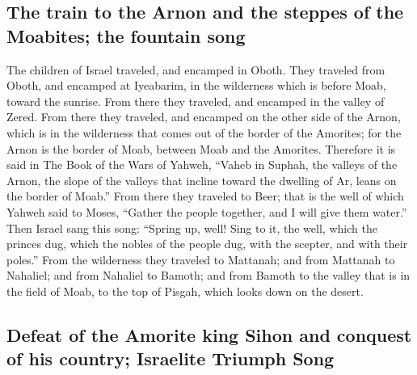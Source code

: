 \hypertarget{the-train-to-the-arnon-and-the-steppes-of-the-moabites-the-fountain-song}{%
\subsection{The train to the Arnon and the steppes of the Moabites; the
fountain
song}\label{the-train-to-the-arnon-and-the-steppes-of-the-moabites-the-fountain-song}}

 The children of Israel traveled, and encamped in Oboth.
 They traveled from Oboth, and encamped at Iyeabarim, in
the wilderness which is before Moab, toward the sunrise. 
From there they traveled, and encamped in the valley of Zered.
 From there they traveled, and encamped on the other side
of the Arnon, which is in the wilderness that comes out of the border of
the Amorites; for the Arnon is the border of Moab, between Moab and the
Amorites.  Therefore it is said in The Book of the Wars
of Yahweh, ``Vaheb in Suphah, the valleys of the Arnon, 
the slope of the valleys that incline toward the dwelling of Ar, leans
on the border of Moab.''  From there they traveled to
Beer; that is the well of which Yahweh said to Moses, ``Gather the
people together, and I will give them water.''  Then
Israel sang this song: ``Spring up, well! Sing to it, 
the well, which the princes dug, which the nobles of the people dug,
with the scepter, and with their poles.'' From the wilderness they
traveled to Mattanah;  and from Mattanah to Nahaliel; and
from Nahaliel to Bamoth;  and from Bamoth to the valley
that is in the field of Moab, to the top of Pisgah, which looks down on
the desert.

\hypertarget{defeat-of-the-amorite-king-sihon-and-conquest-of-his-country-israelite-triumph-song}{%
\subsection{Defeat of the Amorite king Sihon and conquest of his
country; Israelite Triumph
Song}\label{defeat-of-the-amorite-king-sihon-and-conquest-of-his-country-israelite-triumph-song}}

